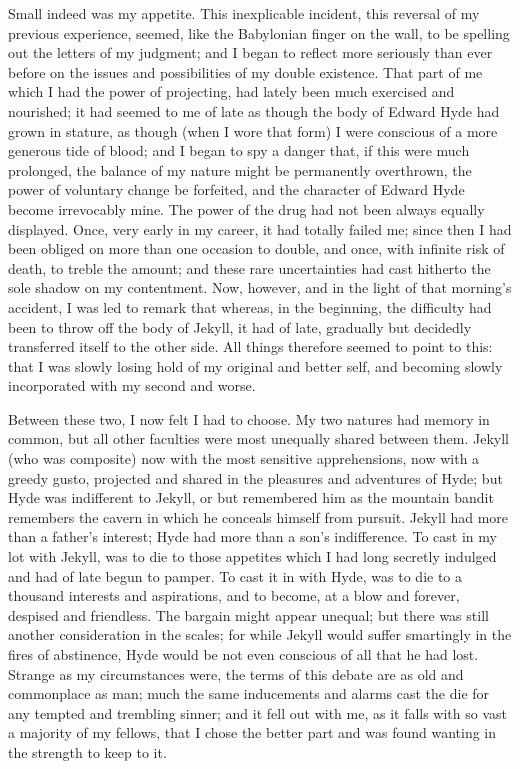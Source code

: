 \documentclass[]{novel}
\begin{document}
Small indeed was my appetite. This inexplicable incident, this reversal of my previous experience, seemed, like the Babylonian finger on the wall, to be spelling out the letters of my judgment; and I began to reflect more seriously than ever before on the issues and possibilities of my double existence. That part of me which I had the power of projecting, had lately been much exercised and nourished; it had seemed to me of late as though the body of Edward Hyde had grown in stature, as though (when I wore that form) I were conscious of a more generous tide of blood; and I began to spy a danger that, if this were much prolonged, the balance of my nature might be permanently overthrown, the power of voluntary change be forfeited, and the character of Edward Hyde become irrevocably mine. The power of the drug had not been always equally displayed. Once, very early in my career, it had totally failed me; since then I had been obliged on more than one occasion to double, and once, with infinite risk of death, to treble the amount; and these rare uncertainties had cast hitherto the sole shadow on my contentment. Now, however, and in the light of that morning's accident, I was led to remark that whereas, in the beginning, the difficulty had been to throw off the body of Jekyll, it had of late, gradually but decidedly transferred itself to the other side. All things therefore seemed to point to this: that I was slowly losing hold of my original and better self, and becoming slowly incorporated with my second and worse.

Between these two, I now felt I had to choose. My two natures had memory in common, but all other faculties were most unequally shared between them. Jekyll (who was composite) now with the most sensitive apprehensions, now with a greedy gusto, projected and shared in the pleasures and adventures of Hyde; but Hyde was indifferent to Jekyll, or but remembered him as the mountain bandit remembers the cavern in which he conceals himself from pursuit. Jekyll had more than a father's interest; Hyde had more than a son's indifference. To cast in my lot with Jekyll, was to die to those appetites which I had long secretly indulged and had of late begun to pamper. To cast it in with Hyde, was to die to a thousand interests and aspirations, and to become, at a blow and forever, despised and friendless. The bargain might appear unequal; but there was still another consideration in the scales; for while Jekyll would suffer smartingly in the fires of abstinence, Hyde would be not even conscious of all that he had lost. Strange as my circumstances were, the terms of this debate are as old and commonplace as man; much the same inducements and alarms cast the die for any tempted and trembling sinner; and it fell out with me, as it falls with so vast a majority of my fellows, that I chose the better part and was found wanting in the strength to keep to it.
\end{document}
